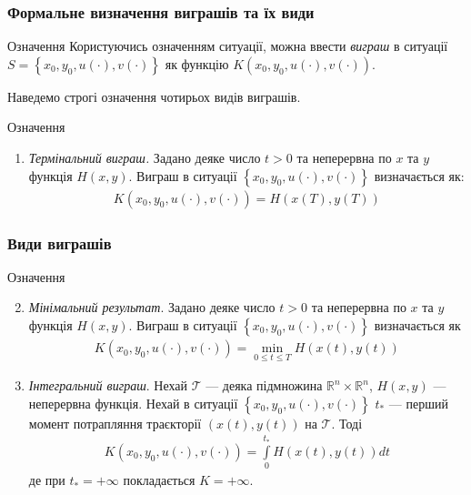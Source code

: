 \documentclass[10pt,pdf]{beamer}
\newcommand{\R}{\mathbb{R}}
\newcommand{\T}{\mathcal{T}}
\renewcommand{\l}{\left}
\renewcommand{\r}{\right}
\newcommand{\intl}{\int\limits}
\begin{document}
    \begin{frame}
        \frametitle{Формальне визначення виграшів та їх види}

        \begin{block}{Означення}
            Користуючись означенням ситуації, можна ввести \emph{виграш} в ситуації $S = \l\{x_0, y_0, u(\cdot), v(\cdot) \r\}$
            як функцію $K(x_0, y_0, u(\cdot), v(\cdot))$.
        \end{block}

        Наведемо строгі означення чотирьох видів виграшів.

        \begin{block}{Означення}
            \begin{enumerate}
                \item \emph{Термінальний виграш.} Задано деяке число $t>0$ та неперервна по $x$ та $y$ функція $H(x, y)$. Виграш в ситуації $\l\{x_0, y_0, u(\cdot), v(\cdot) \r\}$
                визначається як:
                \begin{gather*}
                    K(x_0, y_0, u(\cdot), v(\cdot)) = H(x(T), y(T))
                \end{gather*}
            \end{enumerate}
        \end{block}
    \end{frame}
    \begin{frame}
        \frametitle{Види виграшів}
        
        \begin{block}{Означення}
            \begin{enumerate}
                \setcounter{enumi}{1}
                \item \emph{Мінімальний результат}. Задано деяке число $t>0$ та неперервна по $x$ та $y$ функція $H(x, y)$. Виграш в ситуації $\l\{x_0, y_0, u(\cdot), v(\cdot) \r\}$
                визначається як
                \begin{gather*}
                    K(x_0, y_0, u(\cdot), v(\cdot)) = \underset{0 \leq t \leq T}{\min} H(x(t), y(t))
                \end{gather*}

                \item  \emph{Інтегральний виграш}. Нехай $\T$ --- деяка підмножина $\R^n \times \R^n$, $H(x, y)$ --- неперервна функція. Нехай в ситуації $\l\{x_0, y_0, u(\cdot), v(\cdot) \r\}$
                $t_*$ --- перший момент потрапляння траєкторії $(x(t), y(t))$ на $\T$.
                Тоді
                \begin{gather*}
                    K(x_0, y_0, u(\cdot), v(\cdot)) = \intl_0^{t_*} H(x(t), y(t)) dt
                \end{gather*}
                де при $t_* = +\infty$ покладається $K = +\infty$.

            \end{enumerate}
        \end{block}
    
    \end{frame}
\end{document}
